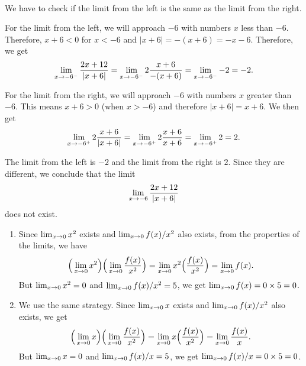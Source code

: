 	\spc
	
	\\
	We have to check if the limit from the left is the same as the limit from the right. 
	
	For the limit from the left, we will approach $-6$ with numbers $x$ less than $-6$. Therefore, $x + 6 < 0$ for $x < -6$ and $|x + 6| = - (x + 6) = -x - 6$. Therefore, we get
		\begin{align*}
		\lim_{x \rightarrow -6^-} \frac{2x + 12}{|x + 6|} = \lim_{x \rightarrow -6^-} 2 \frac{x + 6}{-(x + 6)} = \lim_{x \rightarrow -6^-} -2 = -2 .
		\end{align*}
		
	For the limit from the right, we will approach $-6$ with numbers $x$ greater than $-6$. This means $x + 6 > 0$ (when $x > -6$) and therefore $|x + 6| = x+ 6$. We then get
		\begin{align*}
		\lim_{x \rightarrow -6^+} 2 \frac{x + 6}{|x + 6|} = \lim_{x \rightarrow -6^+} 2 \frac{x + 6}{x + 6} = \lim_{x \rightarrow -6^+} 2 = 2 .
		\end{align*}
		
	The limit from the left is $-2$ and the limit from the right is $2$. Since they are different, we conclude that the limit
		\begin{align*}
		\lim_{x \rightarrow -6} \frac{2x + 12}{|x+ 6|}
		\end{align*}
	does not exist.
	
	\spc
	
	\begin{enumerate}[label=\textbf{\alph*)}]
	\item Since $\lim_{x \rightarrow 0} x^2$ exists and $\lim_{x \rightarrow 0} f(x)/x^2$ also exists, from the properties of the limits, we have
		\begin{align*}
		\Big( \lim_{x \rightarrow 0} x^2 \Big) \Big( \lim_{x \rightarrow 0} \frac{f(x)}{x^2} \Big) = \lim_{x \rightarrow 0} x^2 \Big( \frac{f(x)}{x^2} \Big) = \lim_{x \rightarrow 0} f(x) .
		\end{align*}
	But $\lim_{x \rightarrow 0} x^2 = 0$ and $\lim_{x \rightarrow 0} f(x)/x^2 = 5$, we get $\lim_{x \rightarrow 0} f(x) = 0 \times 5 = 0$.
	\item We use the same strategy. Since $\lim_{x \rightarrow 0} x$ exists and $\lim_{x \rightarrow 0} f(x)/x^2$ also exists, we get
		\begin{align*}
		\Big( \lim_{x \rightarrow 0} x \Big) \Big( \lim_{x \rightarrow 0} \frac{f(x)}{x^2} \Big) = \lim_{x \rightarrow 0} x \Big( \frac{f(x)}{x^2} \Big) = \lim_{x \rightarrow 0} \frac{f(x)}{x} .
		\end{align*}
	But $\lim_{x \rightarrow 0} x = 0$ and $\lim_{x \rightarrow 0} f(x)/x = 5$, we get $\lim_{x \rightarrow 0} f(x)/x = 0 \times 5 = 0$.
	\end{enumerate}
	
	
	
